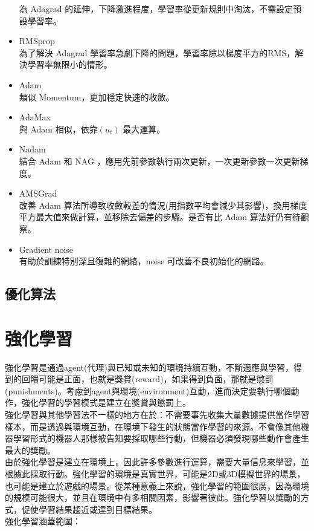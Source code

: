\documentclass[14pt,a4paper]{report}  %
\begin{document}
\begin{itemize}
為 Adagrad 的延伸，下降激進程度，學習率從更新規則中淘汰，不需設定預設學習率。\\
\item RMSprop\\[6pt]
為了解決 Adagrad 學習率急劇下降的問題，學習率除以梯度平方的RMS，解決學習率無限小的情形。\\
\item Adam\\[6pt]
類似 Momentum，更加穩定快速的收斂。\\
\item AdaMax\\[6pt]
與 Adam 相似，依靠$(u_t)$ 最大運算。\\
\item Nadam\\[6pt]
結合 Adam 和 NAG ，應用先前參數執行兩次更新，一次更新參數一次更新梯度。\\
\item AMSGrad\\[6pt]
改善 Adam 算法所導致收斂較差的情況(用指數平均會減少其影響)，換用梯度平方最大值來做計算，並移除去偏差的步驟。是否有比 Adam 算法好仍有待觀察。\\
\item Gradient noise\\[6pt]
有助於訓練特別深且復雜的網絡，noise 可改善不良初始化的網路。\\
\end{itemize}
\subsection{優化算法}
\newpage
\section{強化學習}
強化學習是通過agent(代理)與已知或未知的環境持續互動，不斷適應與學習，得到的回饋可能是正面，也就是獎賞(reward)，如果得到負面，那就是懲罰(punishments)。考慮到agent與環境(environment)互動，進而決定要執行哪個動作，強化學習的學習模式是建立在獎賞與懲罰上。\\[6pt]
強化學習與其他學習法不一樣的地方在於：不需要事先收集大量數據提供當作學習樣本，而是透過與環境互動，在環境下發生的狀態當作學習的來源。不會像其他機器學習形式的機器人那樣被告知要採取哪些行動，但機器必須發現哪些動作會產生最大的獎勵。\\[6pt]
由於強化學習是建立在環境上，因此許多參數進行運算，需要大量信息來學習，並根據此採取行動。強化學習的環境是真實世界，可能是2D或3D模擬世界的場景，也可能是建立於遊戲的場景。從某種意義上來說，強化學習的範圍很廣，因為環境的規模可能很大，並且在環境中有多相關因素，影響著彼此。強化學習以獎勵的方式，促使學習結果趨近或達到目標結果。\\[12pt]
強化學習涵蓋範圍：\\
\end{document}
